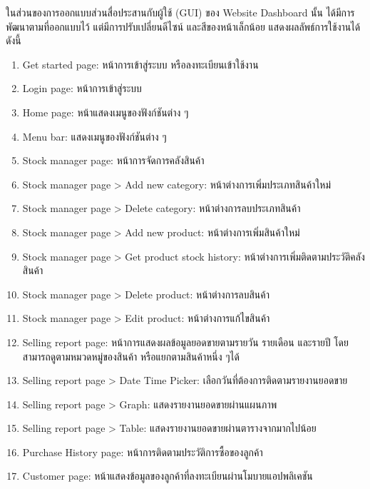 ในส่วนของการออกแบบส่วนสื่อประสานกับผู้ใช้ (GUI) ของ Website Dashboard นั้น ได้มีการพัฒนาตามที่ออกแบบไว้ แต่มีการปรับเปลี่ยนดีไซน์ และสีของหน้าเล็กน้อย แสดงผลลัพธ์การใช้งานได้ดังนี้
\begin{enumerate}
    \item Get started page: หน้าการเข้าสู่ระบบ หรือลงทะเบียนเข้าใช้งาน
    \item Login page: หน้าการเข้าสู่ระบบ
    \item Home page:  หน้าแสดงเมนูของฟังก์ชันต่าง ๆ
    \item Menu bar:  แสดงเมนูของฟังก์ชันต่าง ๆ
    \item Stock manager page: หน้าการจัดการคลังสินค้า
    \item Stock manager page > Add new category: หน้าต่างการเพิ่มประเภทสินค้าใหม่
    \item Stock manager page > Delete category: หน้าต่างการลบประเภทสินค้า
    \item Stock manager page > Add new product: หน้าต่างการเพิ่มสินค้าใหม่
    \item Stock manager page > Get product stock history: หน้าต่างการเพิ่มติดตามประวัติคลังสินค้า
    \item Stock manager page > Delete product: หน้าต่างการลบสินค้า
    \item Stock manager page > Edit product: หน้าต่างการแก้ไขสินค้า
    \item Selling report page: หน้าการแสดงผลข้อมูลยอดขายตามรายวัน รายเดือน และรายปี โดยสามารถดูตามหมวดหมู่ของสินค้า หรือแยกตามสินค้าหนึ่ง ๆได้
    \item Selling report page > Date Time Picker: เลือกวันที่ต้องการติดตามรายงานยอดขาย
    \item Selling report page > Graph: แสดงรายงานยอดขายผ่านแผนภาพ
    \item Selling report page > Table: แสดงรายงานยอดขายผ่านตารางจากมากไปน้อย
    \item Purchase History page: หน้าการติดตามประวัติการซื้อของลูกค้า
    \item Customer page: หน้าแสดงข้อมูลของลูกค้าที่ลงทะเบียนผ่านโมบายแอปพลิเคชัน
\end{enumerate}



